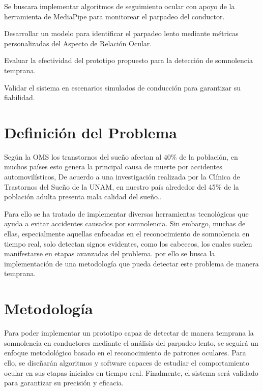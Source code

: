 \documentclass[letterpaper,12pt,oneside]{article}
\begin{document}
Se buscara implementar algoritmos de seguimiento ocular con apoyo de la herramienta de MediaPipe para monitorear el parpadeo del conductor.

Desarrollar un modelo para identificar el parpadeo lento mediante métricas personalizadas del Aspecto de Relación Ocular.

Evaluar la efectividad del prototipo propuesto para la detección de somnolencia temprana.

Validar el sistema en escenarios simulados de conducción para garantizar su fiabilidad.



\section{Definición del Problema}
Según la OMS los transtornos del sueño afectan al 40\%  de la población, en muchos países esto genera la principal causa de muerte por accidentes automovilísticos, De acuerdo a una investigación realizada por la Clínica de Trastornos del Sueño de la UNAM, en nuestro país alrededor del 45\% de la población adulta presenta mala calidad del sueño.\cite{capufe_sleep}.

Para ello se ha tratado de implementar diversas herramientas tecnológicas que ayuda a evitar accidentes causados por somnolencia. Sin embargo, muchas de ellas, especialmente aquellas enfocadas en el reconocimiento de somnolencia en tiempo real, solo detectan signos evidentes, como los cabeceos, los cuales suelen manifestarse en etapas avanzadas del problema. por ello se busca la implementación de una metodología que pueda detectar este problema de manera temprana.
 



\section{Metodología}

Para poder implementar un prototipo capaz de detectar de manera temprana la somnolencia en conductores mediante el análisis del parpadeo lento, se seguirá un enfoque metodológico basado en el reconocimiento de patrones oculares. Para ello, se diseñarán algoritmos y software capaces de estudiar el comportamiento ocular en sus etapas iniciales en tiempo real. Finalmente, el sistema será validado para garantizar su precisión y eficacia.
\end{document}
